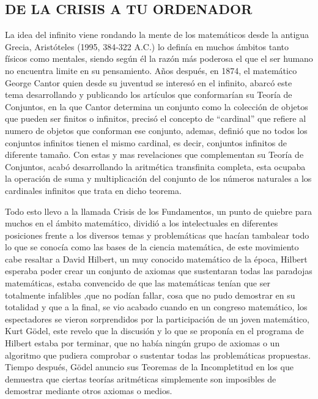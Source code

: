 \documentclass[12pt]{article}
\begin{document}
\begin{center}
\section{ DE LA CRISIS A TU ORDENADOR}
\end{center}
\begin{flushleft}
\vspace{25PT}
\large
La idea del infinito viene rondando la mente de los matemáticos desde la antigua Grecia, Aristóteles (1995, 384-322 A.C.) lo definía en muchos ámbitos tanto físicos como mentales, siendo según él la razón más poderosa el que el ser humano no encuentra limite en su pensamiento. \cite{Aris}
Años después, en 1874, el matemático George Cantor quien desde su juventud se interesó en el infinito, abarcó este tema desarrollando y publicando los artículos que conformarían su Teoría de Conjuntos, en la que Cantor determina un conjunto como la colección de objetos que pueden ser finitos o infinitos, precisó el concepto de “cardinal” que refiere al numero de objetos que conforman ese conjunto, ademas, definió que no todos los conjuntos infinitos tienen el mismo cardinal, es decir, conjuntos infinitos de diferente tamaño. Con estas y mas revelaciones que complementan su Teoría de Conjuntos, acabó desarrollando la aritmética transfinita completa, esta ocupaba la operación de suma y multiplicación del conjunto de los números naturales a los cardinales infinitos que trata en dicho teorema.
\cite{Cantor}


\vspace{10PT}


\vspace{15PT}
Todo esto llevo a la llamada Crisis de los Fundamentos, un punto de quiebre para muchos en el ámbito matemático, dividió a los intelectuales en diferentes posiciones frente a los diversos temas y problemáticas que hacían tambalear todo lo que se conocía como las bases de la ciencia matemática, de este movimiento cabe resaltar a David Hilbert, un muy conocido matemático de la época, Hilbert esperaba poder crear un conjunto de axiomas que sustentaran todas las paradojas matemáticas, estaba convencido de que las matemáticas tenían que ser totalmente infalibles ,que no podían fallar, cosa que no pudo demostrar en su totalidad y que a la final, se vio acabado cuando en un congreso matemático, los espectadores se vieron sorprendidos por la participación de un joven matemático, Kurt Gödel, este revelo que la discusión y lo que se proponía en el programa de Hilbert estaba por terminar, que no había ningún grupo de axiomas o un algoritmo que pudiera comprobar o sustentar todas las problemáticas propuestas. Tiempo después, Gödel anuncio sus Teoremas de la Incompletitud en los que demuestra que ciertas teorías aritméticas simplemente son imposibles de demostrar mediante otros axiomas o medios.


\end{flushleft}
\end{document}
